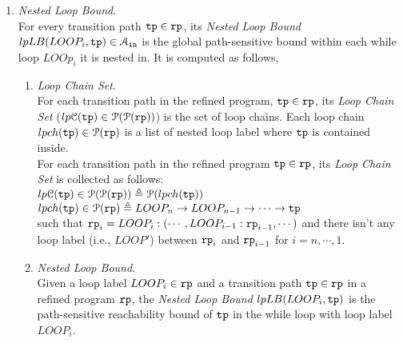 \begin{enumerate}
%
\item \emph{Nested Loop Bound}.
\\
For every transition path $\mathtt{tp} \in \mathtt{rp}$, 
its \emph{Nested Loop Bound} $lpLB(LOOP_i, \mathtt{tp}) \in \mathcal{A}_{\mathtt{in}}$ is the global path-sensitive bound within each while loop $LOOp_i$ it is nested in.
It is computed as follows,
\begin{enumerate}
  \item \emph{Loop Chain Set}.
  \\
  For each transition path in the refined program, $\mathtt{tp} \in \mathtt{rp}$, its \emph{Loop Chain Set} ($lp\mathcal{C}(\mathtt{tp}) \in \mathcal{P}(\mathcal{P}(\mathtt{rp}))$) is the set of 
  loop chains. Each loop chain $lpch(\mathtt{tp}) \in \mathcal{P}(\mathtt{rp})$ is a list of nested loop label where 
  $\mathtt{tp}$ is contained inside.
  \\
For each transition path in the refined program $\mathtt{tp} \in \mathtt{rp}$, 
its \emph{Loop Chain Set} is collected as follows: 
\\
$lp\mathcal{C}(\mathtt{tp}) \in \mathcal{P}(\mathcal{P}(\mathtt{rp})) \triangleq \mathcal{P}(lpch(\mathtt{tp}))$
\\
$lpch(\mathtt{tp}) \in \mathcal{P}(\mathtt{rp}) \triangleq 
LOOP_n \to LOOP_{n-1} \to \cdots \to \mathtt{tp}$
\\
such that 
$\mathtt{rp}_{i}= LOOP_i : (\cdots, LOOP_{i - 1} : \mathtt{rp}_{i-1}, \cdots)$ and
 there isn't any loop label (i.e., $LOOP'$) between $\mathtt{rp}_{i}$ and $\mathtt{rp}_{i - 1}$ for $i = n, \cdots, 1$.
\item  \emph{Nested Loop Bound}.
\\
Given a loop label $LOOP_i \in \mathtt{rp}$ and a transition path $\mathtt{tp} \in \mathtt{rp}$ in a refined program $\mathtt{rp}$,
the \emph{Nested Loop Bound} $lpLB(LOOP_i, \mathtt{tp})$ is the path-sensitive
reachability bound of $\mathtt{tp}$ in the while loop with loop label $LOOP_i$.
\\

\end{enumerate}
\end{enumerate}
